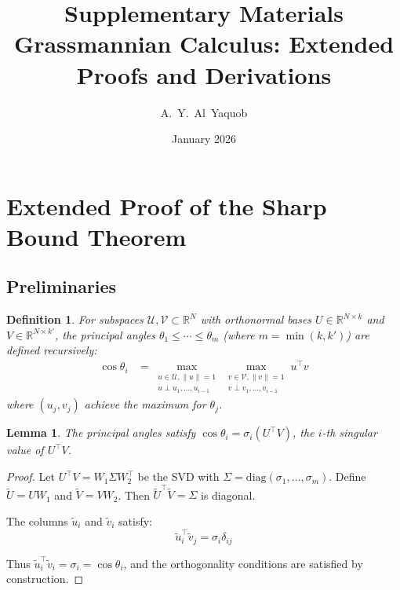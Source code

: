 \documentclass[11pt,a4paper]{article}
\title{\textbf{Supplementary Materials}\\
\large Grassmannian Calculus: Extended Proofs and Derivations}
\author{A.~Y.~Al~Yaquob}
\date{January 2026}
\newtheorem{lemma}[theorem]{Lemma}
\newtheorem{definition}[theorem]{Definition}
\newcommand{\R}{\mathbb{R}}
\begin{document}
\maketitle

\tableofcontents
\newpage

\section{Extended Proof of the Sharp Bound Theorem}

\subsection{Preliminaries}

\begin{definition}
For subspaces $\mathcal{U}, \mathcal{V} \subset \R^N$ with orthonormal bases $U \in \R^{N \times k}$ and $V \in \R^{N \times k'}$, the \emph{principal angles} $\theta_1 \leq \cdots \leq \theta_m$ (where $m = \min(k, k')$) are defined recursively:
\begin{align}
    \cos\theta_i &= \max_{\substack{u \in \mathcal{U}, \|u\|=1 \\ u \perp u_1,\ldots,u_{i-1}}}
    \max_{\substack{v \in \mathcal{V}, \|v\|=1 \\ v \perp v_1,\ldots,v_{i-1}}} u^\top v
\end{align}
where $(u_j, v_j)$ achieve the maximum for $\theta_j$.
\end{definition}

\begin{lemma}
\label{lem:svd-angles}
The principal angles satisfy $\cos\theta_i = \sigma_i(U^\top V)$, the $i$-th singular value of $U^\top V$.
\end{lemma}

\begin{proof}
Let $U^\top V = W_1 \Sigma W_2^\top$ be the SVD with $\Sigma = \mathrm{diag}(\sigma_1, \ldots, \sigma_m)$. Define $\tilde{U} = UW_1$ and $\tilde{V} = VW_2$. Then $\tilde{U}^\top \tilde{V} = \Sigma$ is diagonal.

The columns $\tilde{u}_i$ and $\tilde{v}_i$ satisfy:
\begin{equation}
    \tilde{u}_i^\top \tilde{v}_j = \sigma_i \delta_{ij}
\end{equation}

Thus $\tilde{u}_i^\top \tilde{v}_i = \sigma_i = \cos\theta_i$, and the orthogonality conditions are satisfied by construction.
\end{proof}
\end{document}
